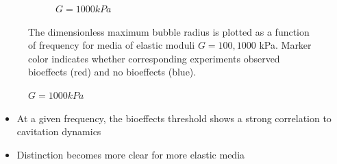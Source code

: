 \begin{frame}
\begin{figure}
\begin{subfigure}{0.47\textwidth}
      \caption[]{$G=1000 kPa$}
    \end{subfigure}
    {\small
      \begin{flushleft}
        The dimensionless maximum bubble radius is plotted as a
        function of frequency for media of elastic moduli
        $G=100, 1000$ kPa. Marker color indicates whether
        corresponding experiments observed bioeffects (red) and no
        bioeffects (blue).
      \end{flushleft}
    }
  \end{figure}
  
  \begin{itemize}
  \item At a given frequency, the bioeffects threshold shows a strong
    correlation to cavitation dynamics
  \item Distinction becomes more clear for more elastic media
  \end{itemize}
\end{frame}
% 
% 
% 
% 


% 
% 
